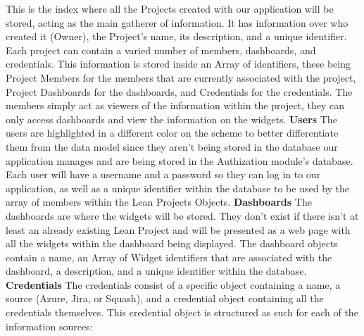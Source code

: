 \documentclass[a4paper,twoside,10pt]{report}
\begin{document}
This is the index where all the Projects created with our application will be stored, acting as the main gatherer of information.
\newline
It has information over who created it (Owner), the Project's name, its description, and a unique identifier.
\newline
Each project can contain a varied number of members, dashboards, and credentials. 
\newline
This information is stored inside an Array of identifiers, these being Project Members for the members that are currently associated with the project, Project Dashboards for the dashboards, and Credentials for the credentials.
\newline
The members simply act as viewers of the information within the project, they can only access dashboards and view the information on the widgets.
\newline
\newline
\textbf{Users}
\newline
The users are highlighted in a different color on the scheme to better differentiate them from the data model since they aren't being stored in the database our application manages and are being stored in the Authization module's database.
\newline
Each user will have a username and a password so they can log in to our application, as well as a unique identifier within the database to be used by the array of members within the Lean Projects Objects.
\newline
\newline
\textbf{Dashboards}
\newline
The dashboards are where the widgets will be stored. They don't exist if there isn't at least an already existing Lean Project and will be presented as a web page with all the widgets within the dashboard being displayed.
\newline
The dashboard objects contain a name, an Array of Widget identifiers that are associated with the dashboard, a description, and a unique identifier within the database.
\newline
\newline
\textbf{Credentials}
\newline
The credentials consist of a specific object containing a name, a source (Azure, Jira, or Squash), and a credential object containing all the credentials themselves.
\newline
This credential object is structured as such for each of the information sources:
\end{document}
